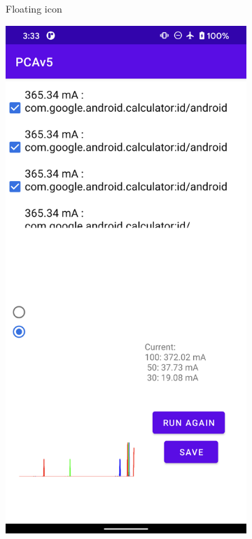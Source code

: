 \begin{figure}[tp]
\begin{subfigure}[]{0.30\columnwidth}
		\caption{Floating icon}
		\label{fig:tool1_screenshot_a}
	\end{subfigure}
        \hfill 
	\begin{subfigure}[]{0.30\columnwidth}
		\includegraphics[width=\textwidth]{figure/003_app_histogram.png}

\end{subfigure}
\end{figure}
